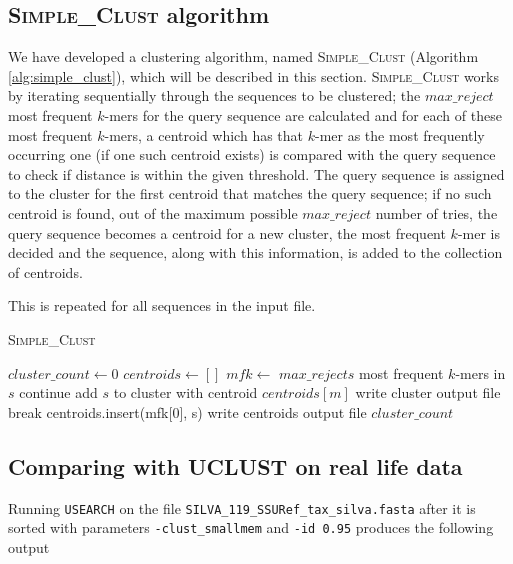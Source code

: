 \subsection{\textsc{Simple\_Clust} algorithm}
We have developed a clustering algorithm, named \textsc{Simple\_Clust}
(Algorithm \ref{alg:simple_clust}), which will be described in this section.
\textsc{Simple\_Clust} works by iterating sequentially through the sequences to
be clustered; the $max\_reject$ most frequent $k$-mers for the query sequence
are calculated and for each of these most frequent $k$-mers, a centroid which
has that $k$-mer as the most frequently occurring one (if one such centroid
exists) is compared with the query sequence to check if distance is within the
given threshold. The query sequence is assigned to the cluster for the first
centroid that matches the query sequence; if no such centroid is found, out of
the maximum possible $max\_reject$ number of tries, the query sequence becomes
a centroid for a new cluster, the most frequent $k$-mer is decided and the
sequence, along with this information, is added to the collection of centroids.

This is repeated for all sequences in the input file.

\begin{algorithm}
  \caption{\textsc{Simple\_Clust}}
  \label{alg:d2_naive}
  \begin{algorithmic}[1]
    \Statex
      \State $cluster\_count \gets 0$
      \State $centroids \gets []$ 
        \State $mfk \gets$ $max\_rejects$ most frequent $k$-mers in $s$
            \State continue
            \State add $s$ to cluster with centroid $centroids[m]$
            \State write cluster output file
            \State break
          \EndIf
        \EndFor
          \State centroids.insert(mfk[0], s)
          \State write centroids output file
        \EndIf
      \EndFor
      \State \Return $cluster\_count$
    \EndFunction
  \end{algorithmic}
  \label{alg:simple_clust}
\end{algorithm}


\subsection{Comparing with UCLUST on real life data}
Running \texttt{USEARCH} on the file \texttt{SILVA\_119\_SSURef\_tax\_silva.fasta} after it is sorted with parameters \texttt{-clust\_smallmem} and \texttt{-id 0.95} produces the following output

